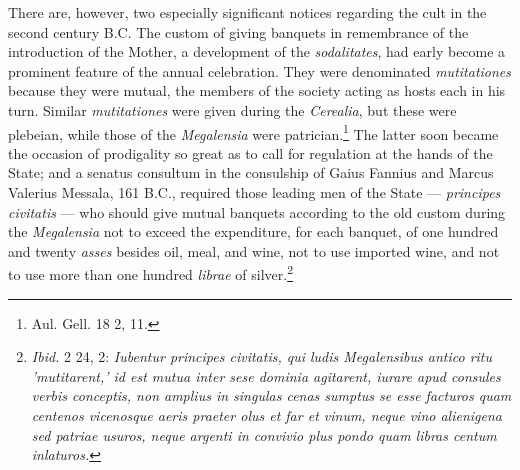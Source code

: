 \documentclass[a4paper, 11pt, oneside, polutonikogreek, english]{article}
\begin{document}
There are, however, two especially significant notices regarding the cult in the second century \textsc{B.C.} The custom of giving banquets in remembrance of the introduction of the Mother, a development of the \emph{sodalitates}, had early become a prominent feature of the annual celebration. They were denominated \emph{mutitationes} because they were mutual, the members of the society acting as hosts each in his turn. Similar \emph{mutitationes} were given during the \emph{Cerealia}, but these were plebeian, while those of the \emph{Megalensia} were patrician.\footnote{Aul. Gell. 18 2, 11.} The latter soon became the occasion of prodigality so great as to call for regulation at the hands of the State; and a senatus consultum in the consulship of Gaius Fannius and Marcus Valerius Messala, 161 \textsc{B.C.}, required those leading men of the State --- \emph{principes civitatis} --- who should give mutual banquets according to the old custom during the \emph{Megalensia} not to exceed the expenditure, for each banquet, of one hundred and twenty \emph{asses} besides oil, meal, and wine, not to use imported wine, and not to use more than one hundred \emph{librae} of silver.\footnote{\emph{Ibid.} 2 24, 2: \emph{Iubentur principes civitatis, qui ludis Megalensibus antico ritu 'mutitarent,' id est mutua inter sese dominia agitarent, iurare apud consules verbis conceptis, non amplius in singulas cenas sumptus se esse facturos quam centenos vicenosque aeris praeter olus et far et vinum, neque vino alienigena sed patriae usuros, neque argenti in convivio plus pondo quam libras centum inlaturos.}}
\end{document}
